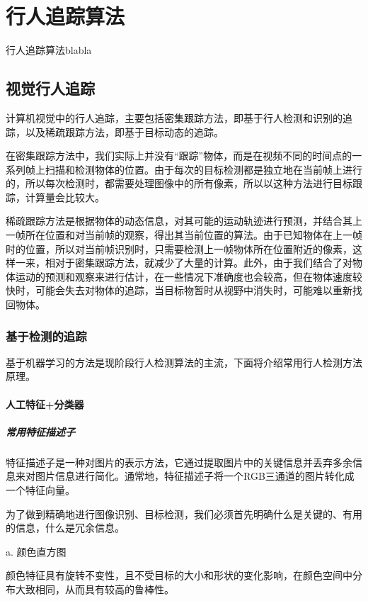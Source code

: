 
\chapter{行人追踪算法}
  行人追踪算法blabla

  
\section{视觉行人追踪}
  计算机视觉中的行人追踪，主要包括密集跟踪方法，即基于行人检测和识别的追踪，以及稀疏跟踪方法，即基于目标动态的追踪。

  在密集跟踪方法中，我们实际上并没有“跟踪”物体，而是在视频不同的时间点的一系列帧上扫描和检测物体的位置。由于每次的目标检测都是独立地在当前帧上进行的，所以每次检测时，都需要处理图像中的所有像素，所以以这种方法进行目标跟踪，计算量会比较大。

  稀疏跟踪方法是根据物体的动态信息，对其可能的运动轨迹进行预测，并结合其上一帧所在位置和对当前帧的观察，得出其当前位置的算法。由于已知物体在上一帧时的位置，所以对当前帧识别时，只需要检测上一帧物体所在位置附近的像素，这样一来，相对于密集跟踪方法，就减少了大量的计算。此外，由于我们结合了对物体运动的预测和观察来进行估计，在一些情况下准确度也会较高，但在物体速度较快时，可能会失去对物体的追踪，当目标物暂时从视野中消失时，可能难以重新找回物体。

\subsection{基于检测的追踪}
  基于机器学习的方法是现阶段行人检测算法的主流，下面将介绍常用行人检测方法原理。

\subsubsection{人工特征+分类器}
\paragraph{常用特征描述子}

  特征描述子是一种对图片的表示方法，它通过提取图片中的关键信息并丢弃多余信息来对图片信息进行简化。通常地，特征描述子将一个RGB三通道的图片转化成一个特征向量。
  
  为了做到精确地进行图像识别、目标检测，我们必须首先明确什么是关键的、有用的信息，什么是冗余信息。

  a. 颜色直方图

  颜色特征具有旋转不变性，且不受目标的大小和形状的变化影响，在颜色空间中分布大致相同，从而具有较高的鲁棒性。

